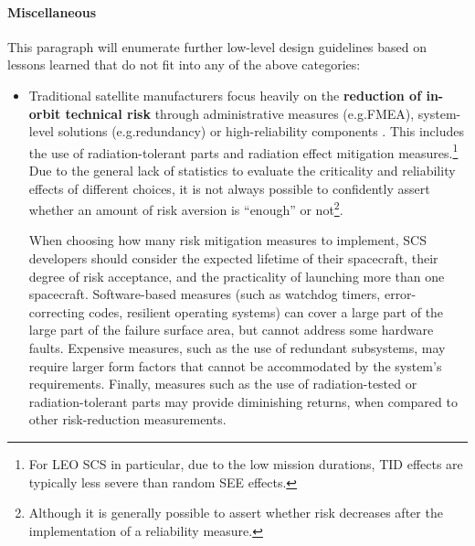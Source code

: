 \documentclass[a4paper,nobib,justified,final]{tufte-book}
\begin{document}
\paragraph{Miscellaneous}
\label{sec:METHODOLOGY_design_miscellaneous}
This paragraph will enumerate further low-level design guidelines based on lessons learned that do not fit into any of the above categories:
\begin{itemize}
	\item Traditional satellite manufacturers focus heavily on the \textbf{reduction of in-orbit technical risk} through administrative measures (e.g.\@ \acl{FMEA}), system-level solutions (e.g.\@ redundancy) or high-reliability components \autocite{kanavourasDesignFaultDetection2021}.
	This includes the use of radiation-tolerant parts and radiation effect mitigation measures.\footnote{For \acs{LEO} \acs{SCS} in particular, due to the low mission durations, \acs{TID} effects are typically less severe than random \acs{SEE} effects.}
	Due to the general lack of statistics to evaluate the criticality and reliability effects of different choices, it is not always possible to confidently assert whether an amount of risk aversion is ``enough'' or not\footnote{Although it is generally possible to assert whether risk decreases after the implementation of a reliability measure.}.

	When choosing how many risk mitigation measures to implement, \acs{SCS} developers should consider the expected lifetime of their spacecraft, their degree of risk acceptance, and the practicality of launching more than one spacecraft. Software-based measures (such as watchdog timers, error-correcting codes, resilient operating systems) can cover a large part of the large part of the failure surface area, but cannot address some hardware faults. Expensive measures, such as the use of redundant subsystems, may require larger form factors that cannot be accommodated by the system's requirements. Finally, measures such as the use of radiation-tested or radiation-tolerant parts may provide diminishing returns, when compared to other risk-reduction measurements.


\end{itemize}
\end{document}

